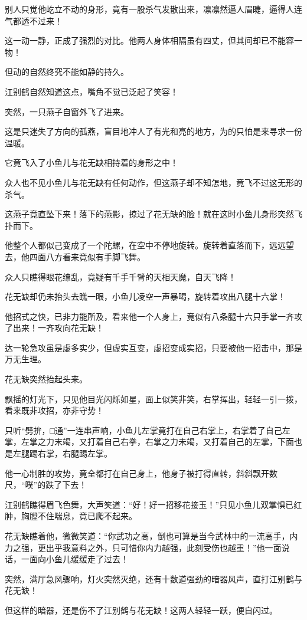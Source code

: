 \documentclass[12pt,oneside]{book}
\begin{document}
别人只觉他屹立不动的身形，竟有一股杀气发散出来，凛凛然逼人眉睫，逼得人连气都透不过来！

这一动一静，正成了强烈的对比。他两人身体相隔虽有四丈，但其间却已不能容一物！

但动的自然终究不能如静的持久。

江别鹤自然知道这点，嘴角不觉已泛起了笑容！

突然，一只燕子自窗外飞了进来。

这是只迷失了方向的孤燕，盲目地冲人了有光和亮的地方，为的只怕是来寻求一份温暖。

它竟飞入了小鱼儿与花无缺相持着的身形之中！

众人也不见小鱼儿与花无缺有任何动作，但这燕子却不知怎地，竟飞不过这无形的杀气。

这燕子竟直坠下来！落下的燕影，掠过了花无缺的脸！就在这时小鱼儿身形突然飞扑而下。

他整个人都似己变成了一个陀螺，在空中不停地旋转。旋转着直落而下，远远望去，他四面八方看来竟似有手脚飞舞。

众人只瞧得眼花缭乱，竟疑有千手千臂的天相天魔，自天飞降！

花无缺却仍未抬头去瞧一眼，小鱼儿凌空一声暴喝，旋转着攻出八腿十六掌！

他招式之快，已非力能所及，看来他一个人身上，竟似有八条腿十六只手掌一齐攻了出来！一齐攻向花无缺！

达一轮急攻虽是虚多实少，但虚实互变，虚招变成实招，只要被他一招击中，那是万无生理。

花无缺突然抬起头来。

飘摇的灯光下，只见他目光闪烁如星，面上似笑非笑，右掌挥出，轻轻一引一拨，看来既非攻招，亦非守势！

只听``劈拚，□通''一连串声响，小鱼儿左掌竟打在自己右掌上，右掌着了自己左掌，左掌之力末竭，又打着自己右拳，右掌之力未竭，又打着自己的左掌，下面也是左腿踢右掌，右腿踢左掌。

他一心制胜的攻势，竟全都打在自己身上，他身子被打得直转，斜斜飘开数尺，``噗''的跌了下去！

江别鹤瞧得眉飞色舞，大声笑道：``好！好一招移花接玉！''只见小鱼儿双掌惧已红肿，胸膛不住喘息，竟已爬不起来。

花无缺瞧着他，微微笑道：``你武功之高，倒也可算是当今武林中的一流高手，内力之强，更出乎我意料之外，只可惜你内力越强，此刻受伤也越重！''他一面说话，一面向小鱼儿缓缓走了过去！

突然，满厅急风骤响，灯火突然灭绝，还有十数道强劲的暗器风声，直打江别鹤与花无缺！

但这样的暗器，还是伤不了江别鹤与花无缺！这两人轻轻一跃，便自闪过。
\end{document}
